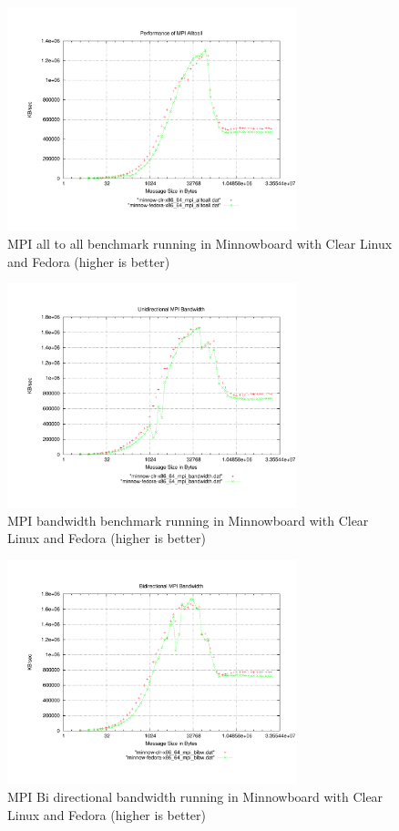 \begin{figure}[H]
\centering
\includegraphics[width=0.75\textwidth]{images/mpbench_clr_experiments/mpi_alltoall.pdf}
\caption{MPI all to all benchmark running in Minnowboard with Clear Linux and
Fedora (higher is better)}
\label{fig:5.2}
\end{figure}


\begin{figure}[H]
\centering
\includegraphics[width=0.75\textwidth]{images/mpbench_clr_experiments/mpi_bandwidth.pdf}
\caption{MPI bandwidth benchmark running in Minnowboard with Clear Linux and
Fedora (higher is better)}
\label{fig:5.3}
\end{figure}


\begin{figure}[H]
\centering
\includegraphics[width=0.75\textwidth]{images/mpbench_clr_experiments/mpi_bibw.pdf}
\caption{MPI Bi directional bandwidth running in Minnowboard with Clear Linux
and Fedora (higher is better)}
\label{fig:5.4}
\end{figure}


